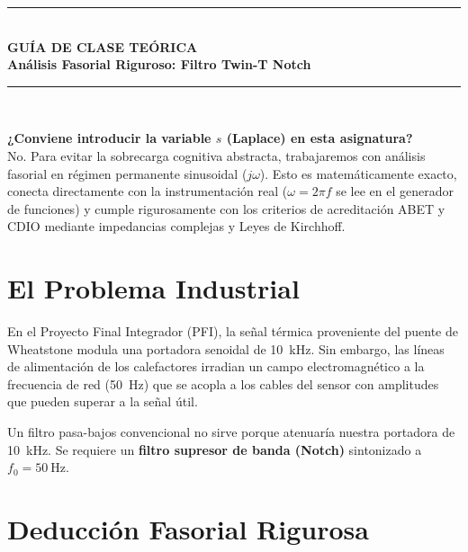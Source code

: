 \documentclass[11pt,a4paper,twoside]{article}
\begin{document}
\begin{center}
    \rule{\textwidth}{1.5pt}\\[0.4cm]
    {\huge \textbf{GUÍA DE CLASE TEÓRICA}}\\[0.2cm]
    {\LARGE \textbf{Análisis Fasorial Riguroso: Filtro Twin-T Notch}}\\[0.3cm]
    \rule{\textwidth}{1.5pt}\\[0.5cm]
\end{center}

\begin{info}
\textbf{¿Conviene introducir la variable $s$ (Laplace) en esta asignatura?}\\
No. Para evitar la sobrecarga cognitiva abstracta, trabajaremos con análisis fasorial en régimen permanente sinusoidal ($j\omega$). Esto es matemáticamente exacto, conecta directamente con la instrumentación real ($\omega = 2\pi f$ se lee en el generador de funciones) y cumple rigurosamente con los criterios de acreditación ABET y CDIO mediante impedancias complejas y Leyes de Kirchhoff.
\end{info}

\section{El Problema Industrial}
En el Proyecto Final Integrador (PFI), la señal térmica proveniente del puente de Wheatstone modula una portadora senoidal de \qty{10}{\kilo\hertz}. Sin embargo, las líneas de alimentación de los calefactores irradian un campo electromagnético a la frecuencia de red (\qty{50}{\hertz}) que se acopla a los cables del sensor con amplitudes que pueden superar a la señal útil. 

Un filtro pasa-bajos convencional no sirve porque atenuaría nuestra portadora de \qty{10}{\kilo\hertz}. Se requiere un \textbf{filtro supresor de banda (Notch)} sintonizado a $f_0 = \qty{50}{\hertz}$.

\section{Deducción Fasorial Rigurosa}
\end{document}
